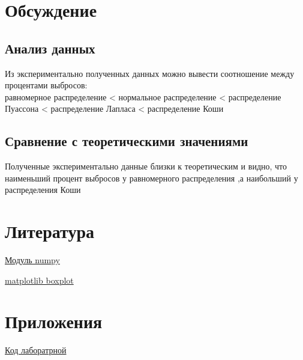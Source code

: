 \documentclass[a4]{article}
\begin{document}
	\newpage
	\section{Обсуждение}
		\subsection{Анализ данных}
		Из экспериментально полученных данных можно вывести соотношение между процентами выбросов:\\
		равномерное распределение < нормальное распределение < распределение Пуассона < распределение Лапласа < распределение Коши
		\subsection{Сравнение с теоретическими значениями}
		Полученные экспериментально данные близки к теоретическим и видно, что наименьший процент выбросов у равномерного распределения ,а наибольший у распределения Коши
	
	\section{Литература}
	
	\href{https://physics.susu.ru/vorontsov/language/numpy.html}{Модуль numpy}
	
	\href{https://matplotlib.org/3.1.1/api/_as_gen/matplotlib.pyplot.boxplot.html}{matplotlib boxplot}
	
	
	\section{Приложения}
	
	\href{https://github.com/dmitry-maltsov/PolyMatStat/blob/master/3/lab3.py}{Код лаборатрной}
	
	
\end{document}
